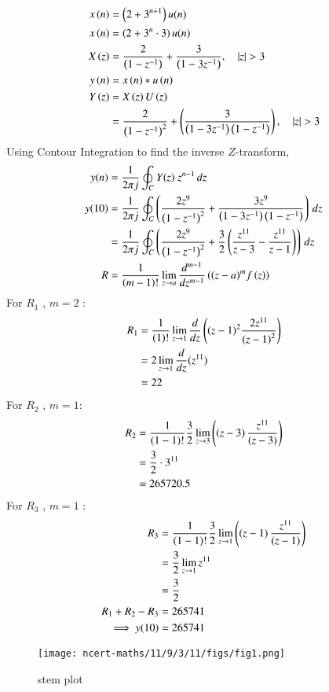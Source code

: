 \documentclass[journal,12pt,twocolumn]{IEEEtran}
\theoremstyle{remark}
\begin{document}
\begin{align}
x\brak{n} &= \brak{2+3^{n+1}}u(n)\\
x\brak{n} &= \brak{2+3^{n}\cdot{3}}u(n)\\
X\brak{z} &= \frac{2}{\brak{1-z^{-1}}}+\frac{3}{\brak{1-3z^{-1}}} , \quad |z|>3\\
y\brak{n} &= x\brak{n}*u\brak{n} \\
Y\brak{z} &= X\brak{z}U\brak{z}\\
&=\frac{2}{\brak{1-z^{-1}}^{2}}+\brak{\frac{3}{\brak{1-3z^{-1}}\brak{1-z^{-1}}}} ,\quad |z|>3
\end{align}
 Using Contour Integration to find the inverse $Z$-transform,
\begin{align}
y(n)&=\frac{1}{2\pi j}\oint_{C}Y(z) \;z^{n-1} \,dz  \\
y(10)&=\frac{1}{2\pi j}\oint_{C}\left(\frac{2z^{9}}{\left(1-z^{-1}\right)^{2}}+\frac{3z^{9}}{\left(1-3z^{-1}\right)\left(1-z^{-1}\right)}\right) \, dz\\
&=\frac{1}{2\pi j}\oint_{C}\left(\frac{2z^{9}}{\left(1-z^{-1}\right)^{2}}+\frac{3}{2}\left(\frac{z^{11}}{z-3}-\frac{z^{11}}{z-1}\right)\right) \,dz\\
R &=\frac{1}{\left(m-1\right)!}\lim\limits_{z\to a}\frac{d^{m-1}}{dz^{m-1}}\left({(z-a)^{m}}f\left(z\right)\right)
\end{align}
For $R_1$ , $m=2$ :
\begin{align}
R_1 &=\frac{1}{\left(1\right)!}\lim\limits_{z\to 1}\frac{d}{dz}\left({\left(z-1\right)^{2}}\frac{2z^{11}}{{\left(z-1\right)^2}}\right)  \\
&=2\lim\limits_{z\to 1}\frac{d}{dz}(z^{11})   \\
&=22
\end{align}
For $R_2$ , $m=1$:
\begin{align}
R_2 &=\frac{1}{\left(1-1\right)!}\frac{3}{2}\lim\limits_{z\to 3}\left(\left(z-3\right)\frac{z^{11}}{\left(z-3\right)}\right) \\
&=\frac{3}{2}\cdot{3^{11}}  \\
&=265720.5
\end{align}
For $R_3$ , $m=1$ :
\begin{align}
R_3 &=\frac{1}{\left(1-1\right)!}\frac{3}{2}\lim\limits_{z\to 1}\left(\left(z-1\right)\frac{z^{11}}{\left(z-1\right)}\right) \\
&=\frac{3}{2}\lim\limits_{z\to1}z^{11}\\
&=\frac{3}{2}\\
 R_1 + R_2 - R_3 &= 265741\\
    \implies  y{(10)} &= 265741
\end{align}
\begin{figure}[h]
    \centering
    \texttt{[image: ncert-maths/11/9/3/11/figs/fig1.png]}
    \caption{stem plot }
    \label{fig:eshaplot1}
\end{figure}
\end{document}
